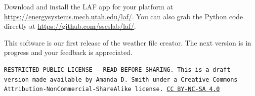 \documentclass[10pt]{article}
\begin{document}
Download and install the LAF app for your platform at \url{https://energysystems.mech.utah.edu/laf/}. You can also grab the Python code directly at \url{https://github.com/sseslab/laf/}.

This software is our first release of the weather file creator. The next version is in progress and your feedback is appreciated.

\bigskip

\noindent
\texttt{\footnotesize RESTRICTED PUBLIC LICENSE --- READ BEFORE SHARING. This is a draft version made available by Amanda D. Smith under a Creative Commons Attribution-NonCommercial-ShareAlike license. 
\href{https://creativecommons.org/licenses/by-nc-sa/4.0/}{CC BY-NC-SA 4.0}}


\printbibliography
\end{document}
